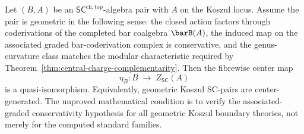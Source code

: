 \begin{conjecture}
\label{conj:center-essential-surjectivity}
Let $(B, A)$ be an $\mathsf{SC}^{\mathrm{ch,top}}$-algebra pair
with $A$ on the Koszul locus. Assume the pair is geometric in the
following sense: the closed action factors through coderivations of
the completed bar coalgebra $\barB(A)$, the induced map on the
associated graded bar-coderivation complex is conservative, and the
genus-curvature class matches the modular characteristic required by
Theorem~\ref{thm:central-charge-complementarity}. Then the fibrewise
center map
\[
\eta_B \colon B \;\longrightarrow\; Z_{\mathsf{SC}}(A)
\]
is a quasi-isomorphism. Equivalently, geometric Koszul SC-pairs are
center-generated. The unproved mathematical condition is to verify the
associated-graded conservativity hypothesis for all geometric
Koszul boundary theories, not merely for the computed standard
families.
\end{conjecture}

